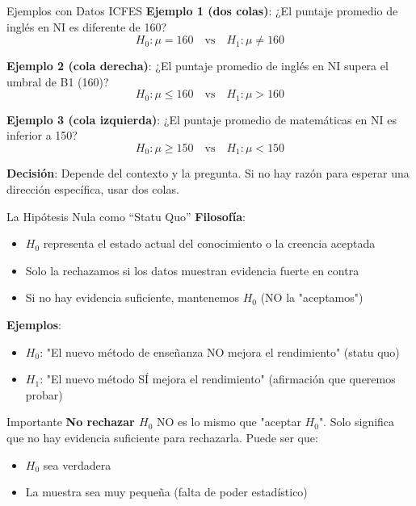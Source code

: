 \documentclass[aspectratio=169, 11pt]{beamer}
\begin{document}
\begin{frame}{Ejemplos con Datos ICFES}
\textbf{Ejemplo 1 (dos colas)}: ¿El puntaje promedio de inglés en NI es diferente de 160?
\[
H_0: \mu = 160 \quad \text{vs} \quad H_1: \mu \neq 160
\]

\vspace{0.3cm}
\textbf{Ejemplo 2 (cola derecha)}: ¿El puntaje promedio de inglés en NI supera el umbral de B1 (160)?
\[
H_0: \mu \leq 160 \quad \text{vs} \quad H_1: \mu > 160
\]

\vspace{0.3cm}
\textbf{Ejemplo 3 (cola izquierda)}: ¿El puntaje promedio de matemáticas en NI es inferior a 150?
\[
H_0: \mu \geq 150 \quad \text{vs} \quad H_1: \mu < 150
\]

\vspace{0.3cm}
\textbf{Decisión}: Depende del contexto y la pregunta. Si no hay razón para esperar una dirección específica, usar dos colas.
\end{frame}

\begin{frame}{La Hipótesis Nula como ``Statu Quo''}
\textbf{Filosofía}:
\begin{itemize}
  \item $H_0$ representa el estado actual del conocimiento o la creencia aceptada
  \item Solo la rechazamos si los datos muestran evidencia \alert{fuerte} en contra
  \item Si no hay evidencia suficiente, mantenemos $H_0$ (NO la "aceptamos")
\end{itemize}

\vspace{0.3cm}
\textbf{Ejemplos}:
\begin{itemize}
  \item $H_0$: "El nuevo método de enseñanza NO mejora el rendimiento" (statu quo)
  \item $H_1$: "El nuevo método SÍ mejora el rendimiento" (afirmación que queremos probar)
\end{itemize}

\vspace{0.3cm}
\begin{alertblock}{Importante}
\textbf{No rechazar $H_0$} NO es lo mismo que "aceptar $H_0$". Solo significa que no hay evidencia suficiente para rechazarla. Puede ser que:
\begin{itemize}
  \item $H_0$ sea verdadera
  \item La muestra sea muy pequeña (falta de poder estadístico)
\end{itemize}
\end{alertblock}
\end{frame}
\end{document}
